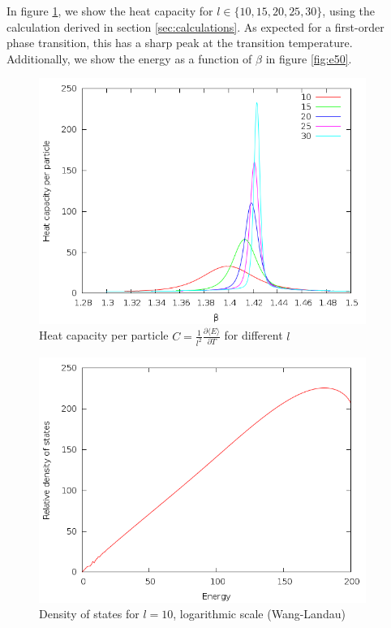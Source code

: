 \documentclass{article}
\begin{document}
In figure \ref{fig:capacity}, we show the heat capacity for $l \in\{10,15,20,25,30\}$, using the calculation derived in section \ref{sec:calculations}.
As expected for a first-order phase transition, this has a sharp peak at the transition temperature.
Additionally, we show the energy as a function of $\beta$ in figure \ref{fig:e50}.

\begin{figure}[H]
\includegraphics[height=8cm]{../results/wanglandau/capacity.png}
\caption{Heat capacity per particle $C = \frac{1}{l^2}\frac{\partial\langle E\rangle}{\partial T}$ for different $l$}
\label{fig:capacity}
\end{figure}

\begin{figure}[H]
\includegraphics[height=8cm]{../results/wanglandau/s10.png}
\caption{Density of states for $l = 10$, logarithmic scale (Wang-Landau)}
\label{fig:s10}
\end{figure}
\end{document}
